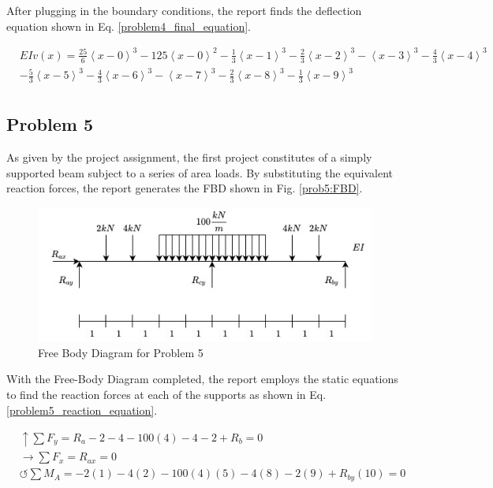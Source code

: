 \documentclass[a4paper]{article}
\begin{document}
After plugging in the boundary conditions, the report finds the deflection equation shown in Eq. \ref{problem4_final_equation}.

\begin{equation}
\begin{split}
  & EI v(x) = \frac{25}{6}\left<x-0\right>^3 - 125\left<x-0\right>^2 - \frac{1}{3}\left<x-1\right>^3 - \frac{2}{3}\left<x-2\right>^3 - \left<x-3\right>^3 - \frac{4}{3}\left<x-4\right>^3\\
& - \frac{5}{3}\left<x-5\right>^3  -  \frac{4}{3}\left<x-6\right>^3 - \left<x-7\right>^3 -  \frac{2}{3}\left<x-8\right>^3 - \frac{1}{3}\left<x-9\right>^3 \\
\end{split}
\label{problem4_final_equation}
\end{equation}



\subsection{Problem 5}

As given by the project assignment, the first project constitutes of a simply supported beam subject to a series of area loads. By substituting the equivalent reaction forces, the report generates the FBD shown in Fig. \ref{prob5:FBD}.

\begin{figure}[h]
\includegraphics[width=\textwidth]{FBD/FBD_5.jpg}
\caption{Free Body Diagram for Problem 5}
\label{FBD_5}
\end{figure}

With the Free-Body Diagram completed, the report employs the static equations to find the reaction forces at each of the supports as shown in Eq. \ref{problem5_reaction_equation}.

\begin{equation}
\begin{split}
	&\uparrow \sum F_y = R_a - 2 - 4 - 100(4) -4 -2 + R_b = 0 \\
 	&\rightarrow \sum F_x = R_{ax} = 0 \\
 	&\circlearrowleft \sum M_A = -2(1) - 4(2) -100(4)(5) - 4(8) - 2(9) + R_{by}(10) = 0 \\
\end{split}
\label{problem5_reaction_equation}
\end{equation}
\end{document}
